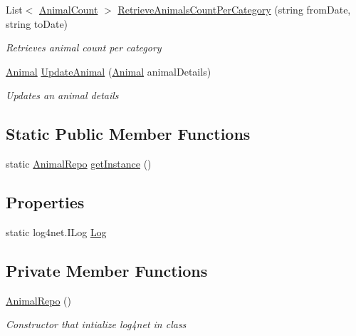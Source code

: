 \begin{DoxyCompactItemize}
List$<$ \hyperlink{classWildLifeTracker_1_1Models_1_1AnimalCount}{Animal\+Count} $>$ \hyperlink{classWildLifeTracker_1_1Repository_1_1AnimalRepo_aec46c9c1a5c50fd399cce98f12e2c6df}{Retrieve\+Animals\+Count\+Per\+Category} (string from\+Date, string to\+Date)
\begin{DoxyCompactList}\small\item\em Retrieves animal count per category \end{DoxyCompactList}\item 
\hyperlink{classWildLifeTracker_1_1Models_1_1Animal}{Animal} \hyperlink{classWildLifeTracker_1_1Repository_1_1AnimalRepo_a2b873c47d97ceb29023685a8c6b05e6a}{Update\+Animal} (\hyperlink{classWildLifeTracker_1_1Models_1_1Animal}{Animal} animal\+Details)
\begin{DoxyCompactList}\small\item\em Updates an animal details \end{DoxyCompactList}\end{DoxyCompactItemize}
\subsection*{Static Public Member Functions}
\begin{DoxyCompactItemize}
\item 
static \hyperlink{classWildLifeTracker_1_1Repository_1_1AnimalRepo}{Animal\+Repo} \hyperlink{classWildLifeTracker_1_1Repository_1_1AnimalRepo_a99d395bc410e71a931859b7832df18d8}{get\+Instance} ()
\end{DoxyCompactItemize}
\subsection*{Properties}
\begin{DoxyCompactItemize}
\item 
static log4net.\+I\+Log \hyperlink{classWildLifeTracker_1_1Repository_1_1AnimalRepo_a5fc9abb86e6110ecd61d0a1a7d740a8a}{Log}
\end{DoxyCompactItemize}
\subsection*{Private Member Functions}
\begin{DoxyCompactItemize}
\item 
\hyperlink{classWildLifeTracker_1_1Repository_1_1AnimalRepo_a87ae250b13d1507332ef5eaade93de91}{Animal\+Repo} ()
\begin{DoxyCompactList}\small\item\em Constructor that intialize log4net in class \end{DoxyCompactList}\end{DoxyCompactItemize}
